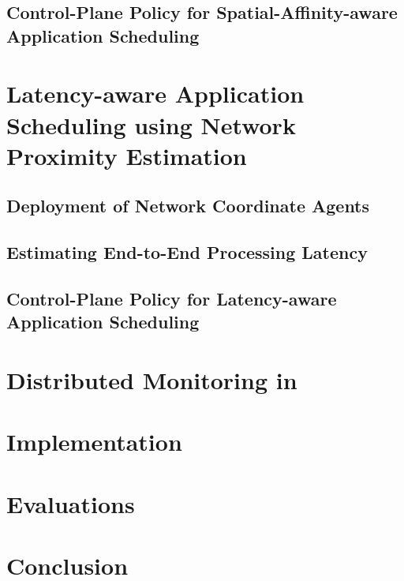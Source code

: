\subsection{Control-Plane Policy for Spatial-Affinity-aware Application Scheduling}

\section{Latency-aware Application Scheduling using Network Proximity Estimation}

\subsection{Deployment of Network Coordinate Agents}

\subsection{Estimating End-to-End Processing Latency}

\subsection{Control-Plane Policy for Latency-aware Application Scheduling}

\section{Distributed Monitoring in \oneedge{}}

\section{Implementation}

\section{Evaluations}

\section{Conclusion}